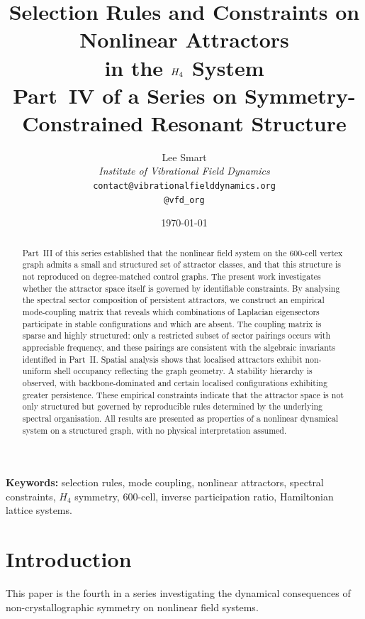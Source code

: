 \documentclass[12pt,a4paper]{article}
\title{%
  \textbf{Selection Rules and Constraints on Nonlinear Attractors\\
  in the $\Hfour$ System}\\[6pt]
  \large Part~IV of a Series on Symmetry-Constrained Resonant Structure%
}
\author{%
  Lee Smart\\[4pt]
  \textit{Institute of Vibrational Field Dynamics}\\[2pt]
  \texttt{contact@vibrationalfielddynamics.org}\\[2pt]
  \texttt{@vfd\_org}%
}
\date{\today}
\newcommand{\Hfour}{H_4}
\begin{document}
\maketitle
\thispagestyle{empty}

\begin{abstract}
Part~III of this series established that the nonlinear field system
on the 600-cell vertex graph admits a small and structured set of
attractor classes, and that this structure is not reproduced on
degree-matched control graphs.  The present work investigates whether
the attractor space itself is governed by identifiable constraints.
By analysing the spectral sector composition of persistent attractors,
we construct an empirical mode-coupling matrix that reveals which
combinations of Laplacian eigensectors participate in stable
configurations and which are absent.  The coupling matrix is sparse
and highly structured: only a restricted subset of sector pairings
occurs with appreciable frequency, and these pairings are consistent
with the algebraic invariants identified in Part~II.  Spatial analysis
shows that localised attractors exhibit non-uniform shell occupancy
reflecting the graph geometry.  A stability hierarchy is observed,
with backbone-dominated and certain localised configurations
exhibiting greater persistence.  These empirical constraints indicate
that the attractor space is not only structured but governed by
reproducible rules determined by the underlying spectral organisation.
All results are presented as properties of a nonlinear dynamical
system on a structured graph, with no physical interpretation assumed.
\end{abstract}

\vspace{1em}
\noindent\textbf{Keywords:}
selection rules, mode coupling, nonlinear attractors, spectral
constraints, $\Hfour$ symmetry, 600-cell, inverse participation ratio,
Hamiltonian lattice systems.

\newpage
\tableofcontents
\newpage


\section{Introduction}\label{sec:intro}

This paper is the fourth in a series investigating the dynamical
consequences of non-crystallographic symmetry on nonlinear field
systems.
\end{document}
